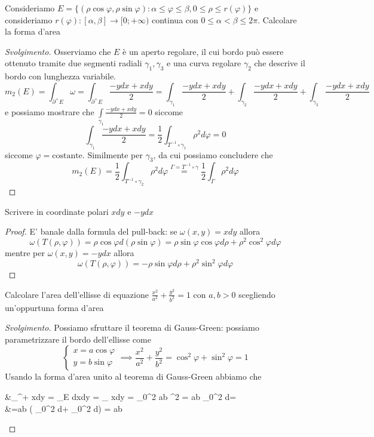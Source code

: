 \begin{example}
	Consideriamo $E = \{(\rho \cos{\varphi}, \rho \sin{\varphi}) : \alpha \leq \varphi \leq \beta, 0 \leq \rho \leq r(\varphi) \}$ e consideriamo $r(\varphi) : [\alpha, \beta] \to [0; +\infty)$ continua con $0 \leq \alpha < \beta \leq 2 \pi$. Calcolare la forma d'area
\end{example}
\begin{proof}[Svolgimento]
	Osserviamo che $E$ è un aperto regolare, il cui bordo può essere ottenuto tramite due segmenti radiali $\gamma_1, \gamma_3$ e una curva regolare $\gamma_2$ che descrive il bordo con lunghezza variabile.
	$$
	m_2(E) = \int_{\partial^{+} E} \omega = \int_{\partial^{+} E} \frac{-ydx + xdy}{2} = \int_{\gamma_1} \frac{-ydx + xdy}{2} + \int_{\gamma_2} \frac{-ydx + xdy}{2} + \int_{\gamma_3} \frac{-ydx + xdy}{2}
	$$
	e possiamo mostrare che $
	\int\limits_{\gamma_1} \frac{-ydx + xdy}{2} = 0
	$
	siccome
	$$
	\int_{\gamma_1} \frac{-ydx + xdy}{2} = \frac{1}{2} \int_{T^{-1} \circ \gamma_1} \rho^2 d\varphi = 0 
	$$
	siccome $\varphi=\text{costante}$. Similmente per $\gamma_3$, da cui possiamo concludere che
	$$
	m_2(E) = \frac{1}{2} \int_{T^{-1} \circ \gamma_2} \rho^2 d\varphi \stackrel{\Gamma = T^{-1} \circ \gamma}{=} \frac{1}{2} \int_\Gamma \rho^2 d\varphi  
	$$
\end{proof}
\begin{exercise}
	Scrivere in coordinate polari $xdy$ e $-ydx$
\end{exercise}
\begin{proof}
	E' banale dalla formula del pull-back: se $\omega(x, y) = xdy$ allora
	$$
	\omega(T(\rho, \varphi)) = \rho \cos{\varphi} d(\rho \sin{\varphi}) = \rho \sin{\varphi} \cos{\varphi} d\rho + \rho^2 \cos^2{\varphi} d\varphi  
	$$
	mentre per $\omega(x, y) = -ydx$ allora
	$$
	\omega(T(\rho, \varphi)) = -\rho \sin{\varphi} d\rho + \rho^2 \sin^2{\varphi} d\varphi  
	$$
\end{proof}
\begin{exercise}
	Calcolare l'area dell'ellisse di equazione $\frac{x^2}{a^2} + \frac{y^2}{b^2} = 1$ con $a, b > 0$ scegliendo un'oppurtuna forma d'area
\end{exercise}
\begin{proof}[Svolgimento]
	Possiamo sfruttare il teorema di Gauss-Green: possiamo parametrizzare il bordo dell'ellisse come
	$$
	\begin{cases}
		x = a \cos{\varphi} \\
		y = b \sin{\varphi}
	\end{cases} \implies \frac{x^2}{a^2} + \frac{y^2}{b^2} = \cos^2{\varphi} + \sin^2{\varphi} = 1
	$$
	Usando la forma d'area unito al teorema di Gauss-Green abbiamo che
	\begin{flalign*}
	&\int_{\partial^{+} \Omega} xdy = \int_E dxdy = \int_{\gamma} xdy = \int_0^{2\pi} ab \cos^2{\varphi} = ab \int_0^{2\pi} d\varphi = \\
	&=ab \left( \int_0^{2\pi}  d\varphi +  \int_0^{2\pi} \cos{2\varphi} d\varphi \right) = \pi ab
	\end{flalign*}
\end{proof}

